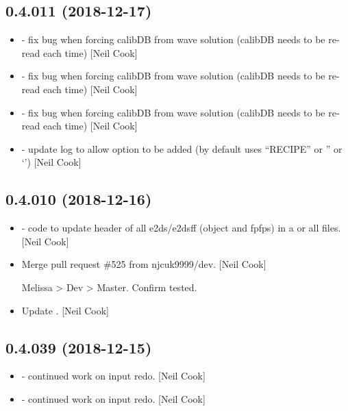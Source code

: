 \documentclass[a4paper,10pt,english]{report}
\begin{document}
\subsection{0.4.011 (2018-12-17)}
\label{\detokenize{misc/changelog:id229}}\begin{itemize}
\item {} 
 - fix bug when forcing calibDB from wave
solution (calibDB needs to be re-read each time) {[}Neil Cook{]}

\item {} 
 - fix bug when forcing calibDB from wave
solution (calibDB needs to be re-read each time) {[}Neil Cook{]}

\item {} 
 - fix bug when forcing calibDB from wave
solution (calibDB needs to be re-read each time) {[}Neil Cook{]}

\item {} 
 - update log to allow option to be added (by default uses
“RECIPE” or ” or ‘’) {[}Neil Cook{]}

\end{itemize}


\subsection{0.4.010 (2018-12-16)}
\label{\detokenize{misc/changelog:id230}}\begin{itemize}
\item {} 
 - code to update header of all e2ds/e2dsff
(object and fpfps) in a  or all files. {[}Neil Cook{]}

\item {} 
Merge pull request \#525 from njcuk9999/dev. {[}Neil Cook{]}

Melissa \textendash{}\textgreater{} Dev \textendash{}\textgreater{} Master. Confirm tested.

\item {} 
Update . {[}Neil Cook{]}

\end{itemize}


\subsection{0.4.039 (2018-12-15)}
\label{\detokenize{misc/changelog:id231}}\begin{itemize}
\item {} 
 - continued work on input redo. {[}Neil Cook{]}

\item {} 
 - continued work on input redo. {[}Neil Cook{]}

\end{itemize}
\end{document}
